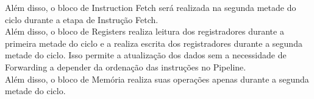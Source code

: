 \documentclass{article}
\begin{document}
\noindent Além disso, o bloco de Instruction Fetch será realizada na segunda metade do ciclo durante a etapa de Instrução Fetch.\\

\noindent Além disso, o bloco de Registers realiza leitura dos registradores durante a primeira metade do ciclo e a realiza escrita dos registradores durante a segunda metade do ciclo. Isso permite a atualização dos dados sem a necessidade de Forwarding a depender da ordenação das instruções no Pipeline.\\

\noindent Além disso, o bloco de Memória realiza suas operações apenas durante a segunda metade do ciclo.
\end{document}
